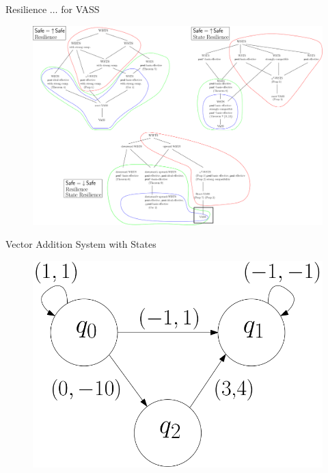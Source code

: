 \documentclass{beamer}
\begin{document}
  \begin{frame}{Resilience $\ldots$ for VASS}
 
   \begin{center}
 	\begin{figure}
 	\vspace{-0.25cm}
\includegraphics[width=1.00\textwidth]{resultC}
	\end{figure}
\end{center}  


  \end{frame}
  \begin{frame}{Vector Addition System with States}
  
   \begin{center}
 	\begin{figure}
 	\vspace{.06cm}
\includegraphics[width=.4\textwidth]{FigC}
	\end{figure}
\end{center}  

  \end{frame}
\end{document}

